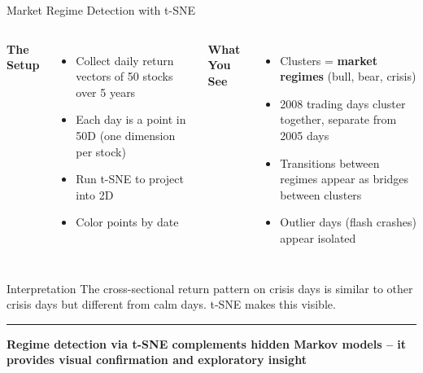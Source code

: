 \documentclass[8pt,aspectratio=169]{beamer}
\newcommand{\bottomnote}[1]{%
\vfill
\vspace{-2mm}
\textcolor{mllavender2}{\rule{\textwidth}{0.4pt}}
\vspace{1mm}
\footnotesize
\textbf{#1}
}
\newenvironment{compactlist}{%
  \begin{itemize}%
    \setlength{\itemsep}{2pt}%
    \setlength{\parskip}{0pt}%
    \setlength{\parsep}{0pt}%
}{%
  \end{itemize}%
}
\newcommand{\highlight}[1]{\textcolor{mlorange}{\textbf{#1}}}
\begin{document}

\begin{frame}[t]{Market Regime Detection with t-SNE}
\begin{columns}[T]
\small
\textbf{The Setup}
\begin{compactlist}
\item Collect daily return vectors of 50 stocks over 5 years
\item Each day is a point in 50D (one dimension per stock)
\item Run t-SNE to project into 2D
\item Color points by date
\end{compactlist}

\small
\textbf{What You See}
\begin{compactlist}
\item Clusters = \highlight{market regimes} (bull, bear, crisis)
\item 2008 trading days cluster together, separate from 2005 days
\item Transitions between regimes appear as bridges between clusters
\item Outlier days (flash crashes) appear isolated
\end{compactlist}
\end{columns}

\vspace{2mm}
\begin{block}{Interpretation}
\scriptsize The cross-sectional return pattern on crisis days is similar to other crisis days but different from calm days. t-SNE makes this visible.
\end{block}

\bottomnote{Regime detection via t-SNE complements hidden Markov models -- it provides visual confirmation and exploratory insight}
\end{frame}
\end{document}
